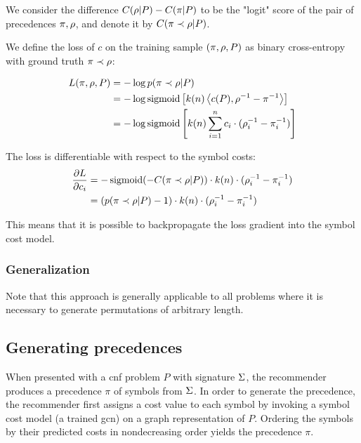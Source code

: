 We consider the difference $C(\rho | P) - C(\pi | P)$
to be the "logit" score of the pair of precedences $\pi, \rho$,
and denote it by $C(\pi \prec \rho | P)$.

We define the loss of $c$ on the training sample $(\pi, \rho, P)$ as binary cross-entropy
with ground truth $\pi \prec \rho$:

\begin{align*}
L(\pi, \rho, P)
&= - \log p(\pi \prec \rho | P) \\
&= - \log \operatorname{sigmoid} \left[k(n) \left<c(P),\rho^{-1} - \pi^{-1}\right>\right] \\
&= - \log \operatorname{sigmoid} \left[k(n) \sum_{i=1}^n c_i \cdot (\rho^{-1}_i - \pi^{-1}_i)\right]
\end{align*}

The loss is differentiable with respect to the symbol costs:
\begin{align*}
\frac{\partial L}{\partial c_i}
&= -\operatorname{sigmoid}(-C(\pi \prec \rho | P)) \cdot k(n) \cdot (\rho^{-1}_i - \pi^{-1}_i) \\
&= (p(\pi \prec \rho | P) - 1) \cdot k(n) \cdot (\rho^{-1}_i - \pi^{-1}_i)
\end{align*}

This means that it is possible to backpropagate the loss gradient into the symbol cost model. 

\subsubsection{Generalization}

Note that this approach is generally applicable to all problems where it is necessary to generate permutations of arbitrary length.


\subsection{Generating precedences}
\label{sec:generating}

When presented with a \gls{cnf} problem $P$ with signature $\operatorname{\Sigma}$,
the recommender produces a precedence $\pi$ of symbols from $\operatorname{\Sigma}$.
In order to generate the precedence,
the recommender first assigns a cost value to each symbol
by invoking a symbol cost model (a trained \gls{gcn}) on a graph representation of $P$.
Ordering the symbols by their predicted costs in nondecreasing order yields the precedence $\pi$.

